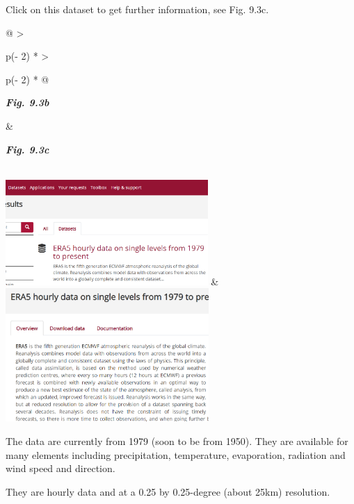 \documentclass[
  letterpaper,
  DIV=11,
  numbers=noendperiod]{scrreprt}
\begin{document}
Click on this dataset to get further information, see Fig. 9.3c.

\begin{longtable}[]{@{}
  >{\raggedright\arraybackslash}p{(\columnwidth - 2\tabcolsep) * }
  >{\raggedright\arraybackslash}p{(\columnwidth - 2\tabcolsep) * }@{}}
\toprule\noalign{}
\begin{minipage}[b]{\linewidth}\raggedright
\textbf{\emph{Fig. 9.3b}}
\end{minipage} & \begin{minipage}[b]{\linewidth}\raggedright
\textbf{\emph{Fig. 9.3c}}
\end{minipage} \\
\midrule\noalign{}
\endhead
\bottomrule\noalign{}
\endlastfoot
\includegraphics[width=3.02657in,height=1.58102in]{figures/Fig9.3b.png}
&
\includegraphics[width=3.04488in,height=2.00404in]{figures/Fig9.3c.png} \\
\end{longtable}

The data are currently from 1979 (soon to be from 1950). They are
available for many elements including precipitation, temperature,
evaporation, radiation and wind speed and direction.

They are hourly data and at a 0.25 by 0.25-degree (about 25km)
resolution.
\end{document}
